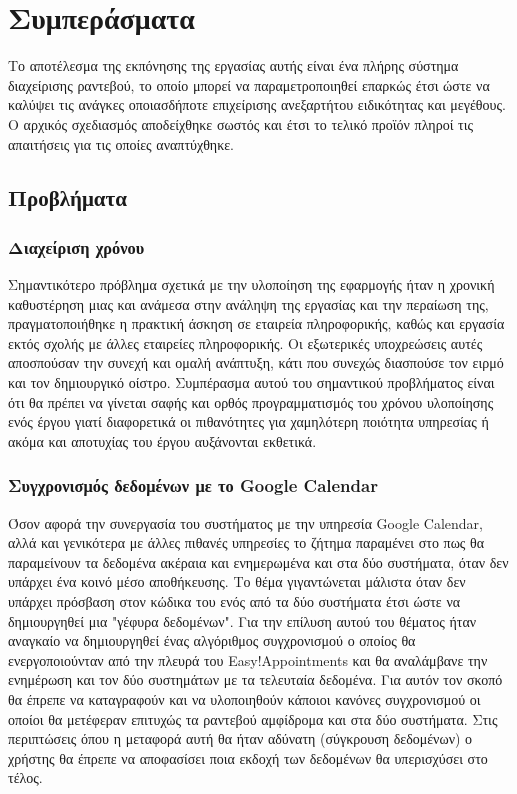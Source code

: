 \chapter{Συμπεράσματα}
Το αποτέλεσμα της εκπόνησης της εργασίας αυτής είναι ένα πλήρης σύστημα διαχείρισης ραντεβού, το οποίο μπορεί να παραμετροποιηθεί επαρκώς έτσι ώστε να καλύψει τις ανάγκες οποιασδήποτε επιχείρισης ανεξαρτήτου ειδικότητας και μεγέθους. Ο αρχικός σχεδιασμός αποδείχθηκε σωστός και έτσι το τελικό προϊόν πληροί τις απαιτήσεις για τις οποίες αναπτύχθηκε. 

\section{Προβλήματα}
\subsection{Διαχείριση χρόνου}
Σημαντικότερο πρόβλημα σχετικά με την υλοποίηση της εφαρμογής ήταν η χρονική καθυστέρηση μιας και ανάμεσα στην ανάληψη της εργασίας και την περαίωση της, πραγματοποιήθηκε η πρακτική άσκηση σε εταιρεία πληροφορικής, καθώς και εργασία εκτός σχολής με άλλες εταιρείες πληροφορικής. Οι εξωτερικές υποχρεώσεις αυτές αποσπούσαν την συνεχή και ομαλή ανάπτυξη, κάτι που συνεχώς διασπούσε τον ειρμό και τον δημιουργικό οίστρο. Συμπέρασμα αυτού του σημαντικού προβλήματος είναι ότι θα πρέπει να γίνεται σαφής και ορθός προγραμματισμός του χρόνου υλοποίησης ενός έργου γιατί διαφορετικά οι πιθανότητες για χαμηλότερη ποιότητα υπηρεσίας ή ακόμα και αποτυχίας του έργου αυξάνονται εκθετικά.

\subsection{Συγχρονισμός δεδομένων με το Google Calendar}
Όσον αφορά την συνεργασία του συστήματος με την υπηρεσία Google Calendar, αλλά και γενικότερα με άλλες πιθανές υπηρεσίες το ζήτημα παραμένει στο πως θα παραμείνουν τα δεδομένα ακέραια και ενημερωμένα και στα δύο συστήματα, όταν δεν υπάρχει ένα κοινό μέσο αποθήκευσης. Το θέμα γιγαντώνεται μάλιστα όταν δεν υπάρχει πρόσβαση στον κώδικα του ενός από τα δύο συστήματα έτσι ώστε να δημιουργηθεί μια "γέφυρα δεδομένων". Για την επίλυση αυτού του θέματος ήταν αναγκαίο να δημιουργηθεί ένας αλγόριθμος συγχρονισμού ο οποίος θα ενεργοποιούνταν από την πλευρά του Easy!Appointments και θα αναλάμβανε την ενημέρωση και τον δύο συστημάτων με τα τελευταία δεδομένα. Για αυτόν τον σκοπό θα έπρεπε να καταγραφούν και να υλοποιηθούν κάποιοι κανόνες συγχρονισμού οι οποίοι θα μετέφεραν επιτυχώς τα ραντεβού αμφίδρομα και στα δύο συστήματα. Στις περιπτώσεις όπου η μεταφορά αυτή θα ήταν αδύνατη (σύγκρουση δεδομένων) ο χρήστης θα έπρεπε να αποφασίσει ποια εκδοχή των δεδομένων θα υπερισχύσει στο τέλος.

